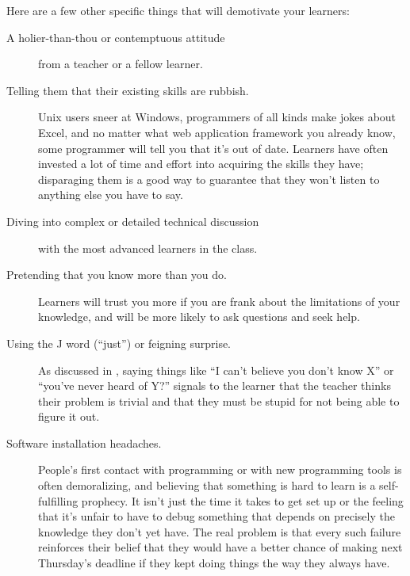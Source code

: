 Here are a few other specific things that will demotivate your learners:

\begin{description}

\item[A holier-than-thou or contemptuous attitude]
  from a teacher or a fellow learner.

\item[Telling them that their existing skills are rubbish.]
  Unix users sneer at Windows,
  programmers of all kinds make jokes about Excel,
  and no matter what web application framework you already know,
  some programmer will tell you that it's out of date.
  Learners have often invested a lot of time and effort into acquiring the skills they have;
  disparaging them is a good way to guarantee that
  they won't listen to anything else you have to say.

\item[Diving into complex or detailed technical discussion]
  with the most advanced learners in the class.

\item[Pretending that you know more than you do.]
  Learners will trust you more if you are frank about the limitations of your knowledge,
  and will be more likely to ask questions and seek help.

\item[Using the J word (``just'') or feigning surprise.]
  As discussed in ,
  saying things like ``I can't believe you don't know X'' or ``you've never heard of Y?''
  signals to the learner that
  the teacher thinks their problem is trivial
  and  that they must be stupid for not being able to figure it out.

\item[Software installation headaches.]
  People's first contact with programming or with new programming tools is often demoralizing,
  and believing that something is hard to learn is a self-fulfilling prophecy.
  It isn't just the time it takes to get set up
  or the feeling that it's unfair to have to debug something that depends on
  precisely the knowledge they don't yet have.
  The real problem is that every such failure reinforces their belief that
  they would have a better chance of making next Thursday's deadline
  if they kept doing things the way they always have.

\end{description}

